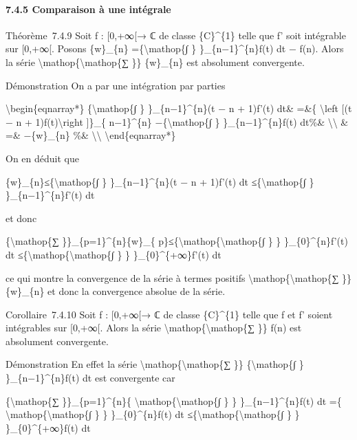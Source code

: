 \documentclass[]{article}
\begin{document}
\paragraph{7.4.5 Comparaison à une intégrale}

Théorème~7.4.9 Soit f : {[}0,+∞{[}→ ℂ de classe \{C\}\^{}\{1\} telle que
f' soit intégrable sur {[}0,+∞{[}. Posons \{w\}\_\{n\}
=\{\textbackslash{}mathop\{∫ \} \}\_\{n−1\}\^{}\{n\}f(t) dt − f(n).
Alors la série \textbackslash{}mathop\{\textbackslash{}mathop\{∑ \}\}
\{w\}\_\{n\} est absolument convergente.

Démonstration On a par une intégration par parties

\textbackslash{}begin\{eqnarray*\} \{\textbackslash{}mathop\{∫ \}
\}\_\{n−1\}\^{}\{n\}(t − n + 1)f'(t) dt\& =\&\{ \textbackslash{}left
{[}(t − n + 1)f(t)\textbackslash{}right {]}\}\_\{ n−1\}\^{}\{n\}
−\{\textbackslash{}mathop\{∫ \} \}\_\{n−1\}\^{}\{n\}f(t) dt\%\&
\textbackslash{}\textbackslash{} \& =\& −\{w\}\_\{n\} \%\&
\textbackslash{}\textbackslash{} \textbackslash{}end\{eqnarray*\}

On en déduit que

\textbar{}\{w\}\_\{n\}\textbar{}≤\{\textbackslash{}mathop\{∫ \}
\}\_\{n−1\}\^{}\{n\}(t − n + 1)\textbar{}f'(t)\textbar{} dt
≤\{\textbackslash{}mathop\{∫ \}
\}\_\{n−1\}\^{}\{n\}\textbar{}f'(t)\textbar{} dt

et donc

\{\textbackslash{}mathop\{∑ \}\}\_\{p=1\}\^{}\{n\}\textbar{}\{w\}\_\{
p\}\textbar{}≤\{\textbackslash{}mathop\{\textbackslash{}mathop\{∫ \} \}
\}\_\{0\}\^{}\{n\}\textbar{}f'(t)\textbar{} dt
≤\{\textbackslash{}mathop\{\textbackslash{}mathop\{∫ \} \}
\}\_\{0\}\^{}\{+∞\}\textbar{}f'(t)\textbar{} dt

ce qui montre la convergence de la série à termes positifs
\textbackslash{}mathop\{\textbackslash{}mathop\{∑ \}\}
\textbar{}\{w\}\_\{n\}\textbar{} et donc la convergence absolue de la
série.

Corollaire~7.4.10 Soit f : {[}0,+∞{[}→ ℂ de classe \{C\}\^{}\{1\} telle
que f et f' soient intégrables sur {[}0,+∞{[}. Alors la série
\textbackslash{}mathop\{\textbackslash{}mathop\{∑ \}\} f(n) est
absolument convergente.

Démonstration En effet la série
\textbackslash{}mathop\{\textbackslash{}mathop\{∑ \}\}
\{\textbackslash{}mathop\{∫ \}
\}\_\{n−1\}\^{}\{n\}\textbar{}f(t)\textbar{} dt est convergente car

\{\textbackslash{}mathop\{∑ \}\}\_\{p=1\}\^{}\{n\}\{
\textbackslash{}mathop\{\textbackslash{}mathop\{∫ \} \}
\}\_\{n−1\}\^{}\{n\}\textbar{}f(t)\textbar{} dt =\{
\textbackslash{}mathop\{\textbackslash{}mathop\{∫ \} \}
\}\_\{0\}\^{}\{n\}\textbar{}f(t)\textbar{} dt
≤\{\textbackslash{}mathop\{\textbackslash{}mathop\{∫ \} \}
\}\_\{0\}\^{}\{+∞\}\textbar{}f(t)\textbar{} dt
\end{document}
